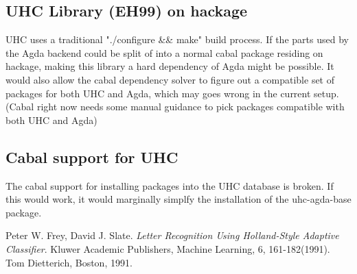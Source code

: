 \documentclass[12pt, a4paper, twoside]{report}
\begin{document}
\subsection{UHC Library (EH99) on hackage}
UHC uses a traditional "./configure \&\& make" build process. If the parts used by the
Agda backend could be split of into a normal cabal package residing on hackage,
making this library a hard dependency of Agda might be possible.
It would also allow the cabal dependency solver to figure out a compatible
set of packages for both UHC and Agda, which may goes wrong in the current setup.
(Cabal right now needs some manual guidance to pick packages compatible with both UHC and Agda)

\subsection{Cabal support for UHC}
The cabal support for installing packages into the UHC database is broken. If this would work, it
would marginally simplfy the installation of the uhc-agda-base package.

\begin{thebibliography}{1}

  Peter W. Frey, David J. Slate.
  \emph{Letter Recognition Using Holland-Style Adaptive Classifier}.
  Kluwer Academic Publishers,
  Machine Learning, 6, 161-182(1991).
  Tom Dietterich, Boston,
  1991.

\end{thebibliography}
\end{document}
